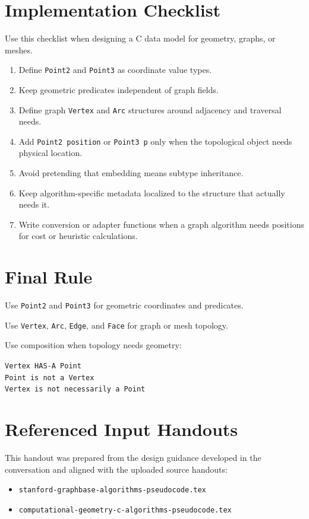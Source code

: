 \documentclass[11pt]{article}
\begin{document}
\section{Implementation Checklist}

\begin{checkbox}
Use this checklist when designing a C data model for geometry, graphs, or meshes.
\begin{enumerate}
  \item Define \texttt{Point2} and \texttt{Point3} as coordinate value types.
  \item Keep geometric predicates independent of graph fields.
  \item Define graph \texttt{Vertex} and \texttt{Arc} structures around adjacency and traversal needs.
  \item Add \texttt{Point2 position} or \texttt{Point3 p} only when the topological object needs physical location.
  \item Avoid pretending that embedding means subtype inheritance.
  \item Keep algorithm-specific metadata localized to the structure that actually needs it.
  \item Write conversion or adapter functions when a graph algorithm needs positions for cost or heuristic calculations.
\end{enumerate}
\end{checkbox}

\section{Final Rule}

Use \texttt{Point2} and \texttt{Point3} for geometric coordinates and predicates.

Use \texttt{Vertex}, \texttt{Arc}, \texttt{Edge}, and \texttt{Face} for graph or mesh topology.

Use composition when topology needs geometry:

\begin{decisionbox}
\begin{center}
\texttt{Vertex HAS-A Point} \\[2pt]
\texttt{Point is not a Vertex} \\[2pt]
\texttt{Vertex is not necessarily a Point}
\end{center}
\end{decisionbox}

\section*{Referenced Input Handouts}

This handout was prepared from the design guidance developed in the conversation and aligned with the uploaded source handouts:

\begin{itemize}
  \item \texttt{stanford-graphbase-algorithms-pseudocode.tex}
  \item \texttt{computational-geometry-c-algorithms-pseudocode.tex}
\end{itemize}
\end{document}
